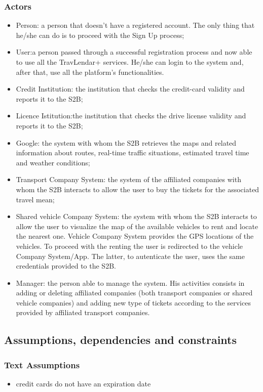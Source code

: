 	\subsubsection{Actors}
			\begin{itemize}
			\item Person: a person that doesn't have a registered account. The only thing that he/she can do is to proceed with the Sign Up process;
			\item User:a person passed through a successful registration process and now
			able to use all the TravLendar+ services. He/she can login to the system and, after that, use all
			the platform's functionalities.
			\item Credit Institution: the institution that checks the credit-card validity and reports it to the S2B;
			\item Licence Istitution:the institution that checks the drive license validity and reports it to the S2B;
			\item Google: the system with whom the S2B retrieves the maps and related information about routes, real-time traffic situations, estimated travel time and weather conditions;
			\item Transport Company System: the system of the affiliated companies with whom the S2B interacts to allow the user to buy the tickets for the associated travel mean;
			\item Shared vehicle Company System: the system with whom the S2B interacts to allow the user to visualize the map of the available vehicles to rent and locate the nearest one. Vehicle Company System provides the GPS locations of the vehicles. To proceed with the renting the user is redirected to the vehicle Company System/App. The latter, to autenticate the user, uses the same credentials provided to the S2B.
			\item Manager: the person able to manage the system. His activities consists in adding or deleting affiliated companies (both  transport companies or shared vehicle companies) and adding new type of tickets according to the services provided by affiliated transport companies.
		\end{itemize}
\subsection{Assumptions, dependencies and constraints}
	\subsubsection{Text Assumptions}
		\begin{itemize}
			\item credit cards do not have an expiration date
		\end{itemize}


